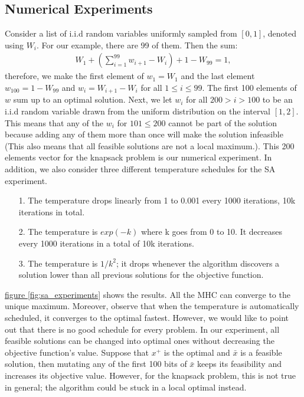 \documentclass[]{article}
\theoremstyle{definition}
\begin{document}
    \subsection{Numerical Experiments}
        Consider a list of i.i.d random variables uniformly sampled from $[0, 1]$, denoted using $W_i$. For our example, there are 99 of them. Then the sum: 
        \begin{align*}
           W_1 + \left(
            \sum_{i = 1}^{99} w_{i + 1} - W_i
           \right) + 1 - W_{99} = 1, 
        \end{align*}
        therefore, we make the first element of $w_1 = W_1$ and the last element $w_{100} = 1 - W_{99}$ and $w_i = W_{i + 1} - W_{i}$ for all $1 \le i \le 99$. The first 100 elements of $w$ sum up to an optimal solution. Next, we let $w_i$ for all $200 > i > 100$ to be an i.i.d random variable drawn from the uniform distribution on the interval $[1, 2]$. This means that any of the $w_i$ for $101 \le 200$ cannot be part of the solution because adding any of them more than once will make the solution infeasible (This also means that all feasible solutions are not a local maximum.). This 200 elements vector for the knapsack problem is our numerical experiment. In addition, we also consider three different temperature schedules for the SA experiment. 
        \begin{itemize}
            \item [1.] The temperature drops linearly from 1 to 0.001 every 1000 iterations, 10k iterations in total. 
            \item [2.] The temperature is $exp(-k)$ where k goes from 0 to 10. It decreases every 1000 iterations in a total of 10k iterations. 
            \item [3.] The temperature is $1/k^2$; it drops whenever the algorithm discovers a solution lower than all previous solutions for the objective function.
        \end{itemize}
        \hyperref[fig:sa_experiments]{figure \ref*{fig:sa_experiments}} shows the results. All the MHC can converge to the unique maximum. Moreover, observe that when the temperature is automatically scheduled, it converges to the optimal fastest. However, we would like to point out that there is no good schedule for every problem. In our experiment, all feasible solutions can be changed into optimal ones without decreasing the objective function's value. Suppose that $x^+$  is the optimal and $\bar x$ is a feasible solution, then mutating any of the first 100 bits of $\bar x$ keeps its feasibility and increases its objective value. However, for the knapsack problem, this is not true in general; the algorithm could be stuck in a local optimal instead. 
\end{document}
